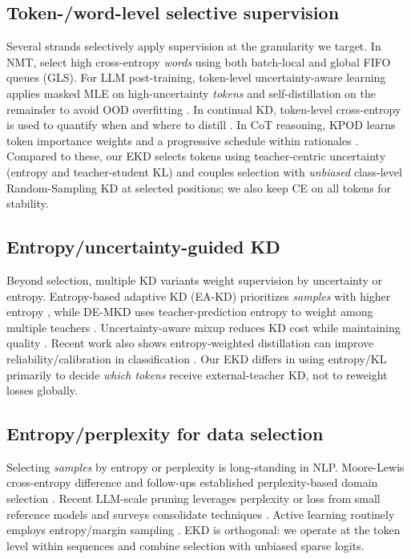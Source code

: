 \documentclass[11pt]{article}
\begin{document}
\subsection{Token-/word-level selective supervision} Several strands selectively apply supervision at the granularity we target. In NMT, \citet{wang2021selectivekd} select high cross-entropy \emph{words} using both batch-local and global FIFO queues (GLS). For LLM post-training, token-level uncertainty-aware learning applies masked MLE on high-uncertainty \emph{tokens} and self-distillation on the remainder to avoid OOD overfitting \citep{liu2025tokenlevel}. In continual KD, token-level cross-entropy is used to quantify when and where to distill \citep{zhang2023continualkd}. In CoT reasoning, KPOD learns token importance weights and a progressive schedule within rationales \citep{feng2024kpod}. Compared to these, our EKD selects tokens using teacher-centric uncertainty (entropy and teacher-student KL) and couples selection with \emph{unbiased} class-level Random-Sampling KD at selected positions; we also keep CE on all tokens for stability.

\subsection{Entropy/uncertainty-guided KD} Beyond selection, multiple KD variants weight supervision by uncertainty or entropy. Entropy-based adaptive KD (EA-KD) prioritizes \emph{samples} with higher entropy \citep{su2023eakd}, while DE-MKD uses teacher-prediction entropy to weight among multiple teachers \citep{cheng2024demkd}. Uncertainty-aware mixup reduces KD cost while maintaining quality \citep{xu2023unix}. Recent work also shows entropy-weighted distillation can improve reliability/calibration in classification \citep{guo2024entropykd}. Our EKD differs in using entropy/KL primarily to decide \emph{which tokens} receive external-teacher KD, not to reweight losses globally.


\subsection{Entropy/perplexity for data selection} Selecting \emph{samples} by entropy or perplexity is long-standing in NLP. Moore-Lewis cross-entropy difference and follow-ups established perplexity-based domain selection \citep{moore2010cediff,axelrod2015few,axelrod2017cynical}. Recent LLM-scale pruning leverages perplexity or loss from small reference models \citep{ankner2022perplexprune} and surveys consolidate techniques \citep{datasel2024survey}. Active learning routinely employs entropy/margin sampling \citep{zhang2022alsurvey}. EKD is orthogonal: we operate at the token level within sequences and combine selection with unbiased sparse logits.
\end{document}
